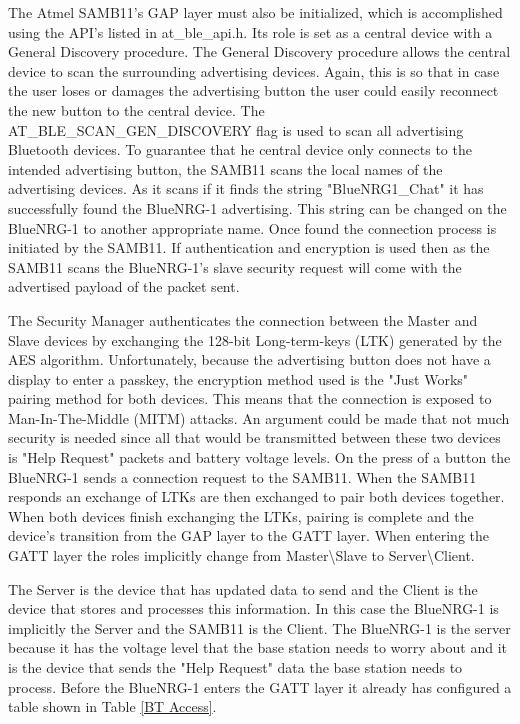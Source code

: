 \documentclass[journal,compsoc]{IEEEtran}
\begin{document}
The Atmel SAMB11’s GAP layer must also be initialized, which is accomplished using the API's listed in at\_ble\_api.h.  Its role is set as a central device with a General Discovery procedure. The General Discovery procedure allows the central device to scan the surrounding advertising devices. Again, this is so that in case the user loses or damages the advertising button the user could easily reconnect the new button to the central device. The AT\_BLE\_SCAN\_GEN\_DISCOVERY flag is used to scan all advertising Bluetooth devices. To guarantee that he central device only connects to the intended advertising button, the SAMB11 scans the local names of the advertising devices. As it scans if it finds the string "BlueNRG1\_Chat" it has successfully found the BlueNRG-1 advertising. This string can be changed on the BlueNRG-1 to another appropriate name. Once found the connection process is initiated by the SAMB11. If authentication and encryption is used then as the SAMB11 scans the BlueNRG-1's slave security request will come with the advertised payload of the packet sent.

The Security Manager authenticates the connection between the Master and Slave devices by exchanging the 128-bit Long-term-keys (LTK) generated by the AES algorithm. Unfortunately, because the advertising button does not have a display to enter a passkey, the encryption method used is the "Just Works" pairing method for both devices. This means that the connection is exposed to Man-In-The-Middle (MITM) attacks. An argument could be made that not much security is needed since all that would be transmitted between these two devices is "Help Request" packets and battery voltage levels. On the press of a button the BlueNRG-1 sends a connection request to the SAMB11. When the SAMB11 responds an exchange of LTKs are then exchanged to pair both devices together.  When both devices finish exchanging the LTKs, pairing is complete and the device's transition from the GAP layer to the GATT layer. When entering the GATT layer the roles implicitly change from Master\textbackslash Slave to Server\textbackslash Client.

The Server is the device that has updated data to send and the Client is the device that stores and processes this information. In this case the BlueNRG-1 is implicitly the Server and the SAMB11 is the Client. The BlueNRG-1 is the server because it has the voltage level that the base station needs to worry about and it is the device that sends the "Help Request" data the base station needs to process. Before the BlueNRG-1 enters the GATT layer it already has configured a table shown in Table \ref{BT Access}. 
\end{document}
